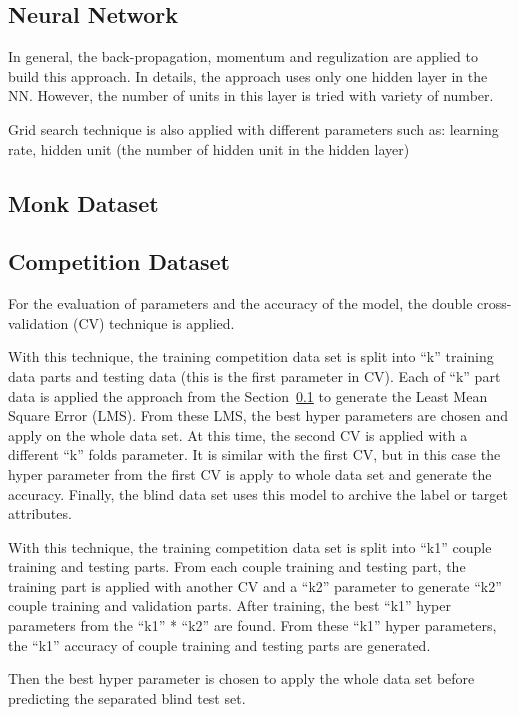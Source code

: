 \documentclass[runningheads,a4paper]{llncs}
\begin{document}
\subsection{Neural Network}
\label{NN}
In general, the back-propagation, momentum and regulization are applied to build this approach.
In details, the approach uses only one hidden layer in the NN. However, the number of units in this layer is tried with variety of number.

Grid search technique is also applied with different parameters such as: learning rate, hidden unit (the number of hidden unit in the hidden layer)
\subsection{Monk Dataset}

\subsection{Competition Dataset}

For the evaluation of parameters and the accuracy of the model, the double cross-validation (CV) technique is applied.

With this technique, the training competition data set is split into ``k'' training data parts and testing data  (this is the first parameter in CV).
Each of ``k'' part data is applied the approach from the Section~\ref{NN} to generate the Least Mean Square Error (LMS). 
From these LMS, the best hyper parameters are chosen and apply on the whole data set.
At this time, the second CV is applied with a different ``k'' folds parameter.
It is similar with the first CV, but in this case the hyper parameter from the first CV is apply to whole data set and generate the accuracy.
Finally, the blind data set uses this model to archive the label or target attributes.

With this technique, the training competition data set is split into ``k1'' couple training and testing parts.
From each couple training and testing part, the training part is applied with another CV and a ``k2'' parameter to generate ``k2'' couple training and validation parts.
After training, the best ``k1'' hyper parameters from the ``k1'' * ``k2'' are found.
From these ``k1'' hyper parameters, the ``k1'' accuracy of couple training and testing parts are generated.

Then the best hyper parameter is chosen to apply the whole data set before predicting the separated blind test set.
\end{document}
